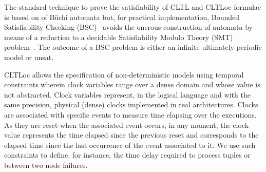 The standard technique to prove the satisfiability of CLTL and CLTLoc formulae is based on of B\"uchi automata \cite{DD07,BRS15} %
but, for practical implementation, Bounded Satisfiability Checking (BSC)~\cite{MPS13} avoids the onerous construction of automata by means of a reduction to a decidable Satisfiability Modulo Theory (SMT) problem~\cite{BRS15}.
The outcome of a BSC problem is either an infinite ultimately periodic model or unsat.

CLTLoc allows the specification of non-deterministic models using temporal constraints wherein clock variables range over a dense domain and whose value is not abstracted.
Clock variables represent, in the logical language and with the same precision, physical (dense) clocks implemented in real architectures.
Clocks are associated with specific events to measure time elapsing over the executions.
As they are reset when the associated event occurs, in any moment, the clock value represents the time elapsed since the previous reset and corresponds to the elapsed time since the last occurrence of the event associated to it.
We use such constraints to define, for instance, the time delay required to process tuples or between two node failures.\\





